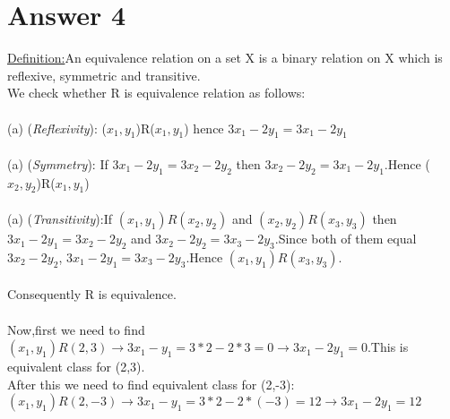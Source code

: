 \documentclass[12pt]{article}
\begin{document}
	\section*{Answer 4}
	\underline{Definition:}An equivalence relation on a set X is a binary relation on X which is
	reflexive, symmetric and transitive.\\
	We check whether R is equivalence relation as follows:\\ \\
	\hspace*{2cm} (a) (\textit{Reflexivity}): ($x_1,y_1$)R($x_1,y_1$) hence $3x_1-2y_1=3x_1-2y_1$\\ \\
	\hspace*{2cm} (a) (\textit{Symmetry}): If $3x_1-2y_1=3x_2-2y_2$ then $3x_2-2y_2=3x_1-2y_1$.Hence ($x_2,y_2$)R($x_1,y_1$) \\ \\
	\hspace*{2cm} (a) (\textit{Transitivity}):If $(x_1,y_1)R(x_2,y_2)$ and $ (x_2,y_2)R(x_3,y_3)$ then $3x_1-2y_1=3x_2-2y_2$ and $3x_2-2y_2=3x_3-2y_3.$Since both of them equal $3x_2-2y_2$, $3x_1-2y_1=3x_3-2y_3$.Hence $ (x_1,y_1)R(x_3,y_3)$.\\ \\
	Consequently R is equivalence.\\ \\
	Now,first we need to find $(x_1,y_1)R(2,3) \rightarrow 3x_1-y_1=3*2-2*3=0 \rightarrow 3x_1-2y_1=0$.This is equivalent class for (2,3).\\
	After this we need to find equivalent class for (2,-3): $(x_1,y_1)R(2,-3) \rightarrow 3x_1-y_1=3*2-2*(-3)=12 \rightarrow 3x_1-2y_1=12$
	
	
	\begin{figure}[h]
	\end{figure}
	
	
	
	
\end{document}
